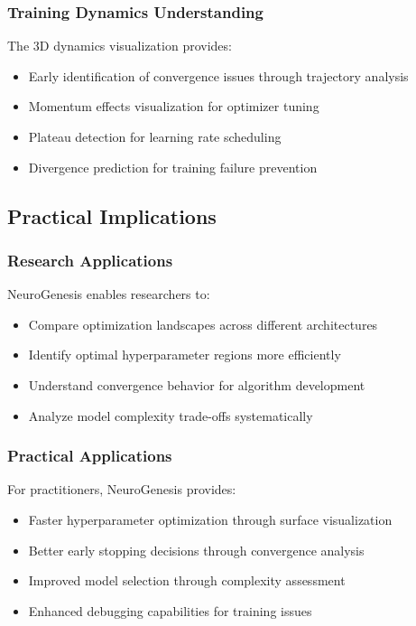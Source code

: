 \documentclass[12pt,a4paper]{article}
\begin{document}
\subsubsection{Training Dynamics Understanding}

The 3D dynamics visualization provides:
\begin{itemize}
    \item Early identification of convergence issues through trajectory analysis
    \item Momentum effects visualization for optimizer tuning
    \item Plateau detection for learning rate scheduling
    \item Divergence prediction for training failure prevention
\end{itemize}

\subsection{Practical Implications}

\subsubsection{Research Applications}

NeuroGenesis enables researchers to:
\begin{itemize}
    \item Compare optimization landscapes across different architectures
    \item Identify optimal hyperparameter regions more efficiently
    \item Understand convergence behavior for algorithm development
    \item Analyze model complexity trade-offs systematically
\end{itemize}

\subsubsection{Practical Applications}

For practitioners, NeuroGenesis provides:
\begin{itemize}
    \item Faster hyperparameter optimization through surface visualization
    \item Better early stopping decisions through convergence analysis
    \item Improved model selection through complexity assessment
    \item Enhanced debugging capabilities for training issues
\end{itemize}
\end{document}
